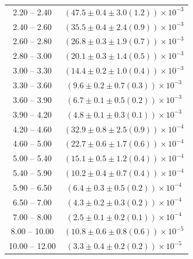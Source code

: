 \begin{table}
\begin{center}
\begin{tabular}{ c | c }
2.20 -- 2.40 & $(47.5\pm0.4\pm3.0(1.2))\times10^{-3}$ \\ 
2.40 -- 2.60 & $(35.5\pm0.4\pm2.4(0.9))\times10^{-3}$ \\ 
2.60 -- 2.80 & $(26.8\pm0.3\pm1.9(0.7))\times10^{-3}$ \\ 
2.80 -- 3.00 & $(20.1\pm0.3\pm1.4(0.5))\times10^{-3}$ \\ 
3.00 -- 3.30 & $(14.4\pm0.2\pm1.0(0.4))\times10^{-3}$ \\ 
3.30 -- 3.60 & $(9.6\pm0.2\pm0.7(0.3))\times10^{-3}$ \\ 
3.60 -- 3.90 & $(6.7\pm0.1\pm0.5(0.2))\times10^{-3}$ \\ 
3.90 -- 4.20 & $(4.8\pm0.1\pm0.3(0.1))\times10^{-3}$ \\ 
4.20 -- 4.60 & $(32.9\pm0.8\pm2.5(0.9))\times10^{-4}$ \\ 
4.60 -- 5.00 & $(22.7\pm0.6\pm1.7(0.6))\times10^{-4}$ \\ 
5.00 -- 5.40 & $(15.1\pm0.5\pm1.2(0.4))\times10^{-4}$ \\ 
5.40 -- 5.90 & $(10.2\pm0.4\pm0.7(0.4))\times10^{-4}$ \\ 
5.90 -- 6.50 & $(6.4\pm0.3\pm0.5(0.2))\times10^{-4}$ \\ 
6.50 -- 7.00 & $(4.3\pm0.2\pm0.3(0.2))\times10^{-4}$ \\ 
7.00 -- 8.00 & $(2.5\pm0.1\pm0.2(0.1))\times10^{-4}$ \\ 
8.00 -- 10.00 & $(10.8\pm0.6\pm0.8(0.6))\times10^{-5}$ \\ 
10.00 -- 12.00 & $(3.3\pm0.4\pm0.2(0.2))\times10^{-5}$ \\ 
\hline
\end{tabular}
\end{center}
\end{table}
 
